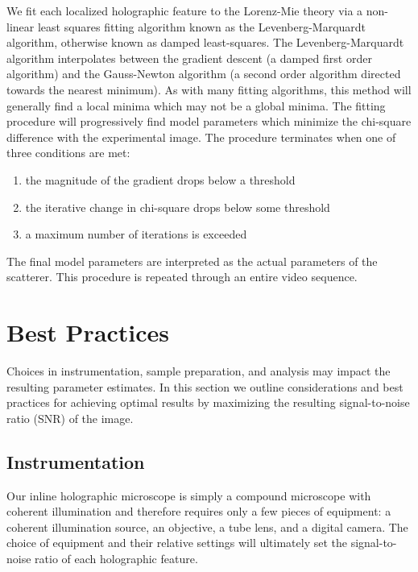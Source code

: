 We fit each localized holographic feature to the Lorenz-Mie theory
via a non-linear least squares fitting algorithm known as the Levenberg-Marquardt
algorithm, otherwise known as damped least-squares. The Levenberg-Marquardt
algorithm interpolates between the gradient descent (a damped first order algorithm)
and the Gauss-Newton algorithm (a second order algorithm directed towards the nearest
minimum). As with many fitting algorithms, this method will generally find a local
minima which may not be a global minima. The fitting procedure will
progressively find model parameters which minimize the chi-square difference
with the experimental image. The procedure terminates when one of three
conditions are met:
\begin{enumerate}
\item the magnitude of the gradient drops below a threshold
\item the iterative change in chi-square drops below some threshold
\item a maximum number of iterations is exceeded
\end{enumerate}
The final model parameters are interpreted as the actual parameters of the
scatterer. This procedure is repeated through an entire video sequence.

\section{Best Practices}

Choices in instrumentation, sample preparation, and analysis may impact
the resulting parameter estimates. In this section we outline considerations
and best practices for achieving optimal results by maximizing the
resulting signal-to-noise ratio (SNR) of the image.

\subsection{Instrumentation}

Our inline holographic microscope is simply a compound microscope with
coherent illumination and therefore requires only a few pieces of equipment:
a coherent illumination source, an objective, a tube lens, and a digital
camera. The choice of equipment and their relative settings will
ultimately set the signal-to-noise ratio of each holographic feature.

